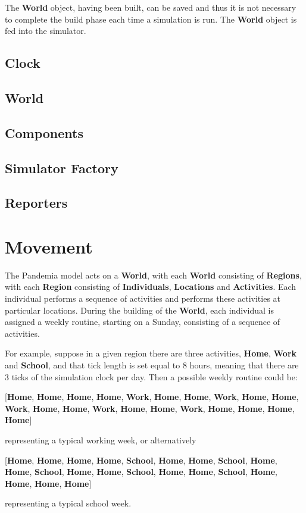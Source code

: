 \documentclass[10pt,letterpaper]{article}
\begin{document}
The \textbf{World} object, having been built, can be saved and thus it is not necessary to complete the build phase each time a simulation is run. The \textbf{World} object is fed into the simulator.

\subsection{Clock}

\subsection{World}

\subsection{Components}

\subsection{Simulator Factory}

\subsection{Reporters}

\section{Movement}

The Pandemia model acts on a \textbf{World}, with each \textbf{World} consisting of \textbf{Regions}, with each \textbf{Region} consisting of \textbf{Individuals}, \textbf{Locations} and \textbf{Activities}. Each individual performs a sequence of activities and performs these activities at particular locations. During the building of the \textbf{World}, each individual is assigned a weekly routine, starting on a Sunday, consisting of a sequence of activities.

For example, suppose in a given region there are three activities, \textbf{Home}, \textbf{Work} and \textbf{School}, and that tick length is set equal to 8 hours, meaning that there are 3 ticks of the simulation clock per day. Then a possible weekly routine could be:
\begin{center}
[\textbf{Home}, \textbf{Home}, \textbf{Home}, \textbf{Home}, \textbf{Work}, \textbf{Home}, \textbf{Home}, \textbf{Work}, \textbf{Home}, \textbf{Home}, \textbf{Work}, \textbf{Home}, \textbf{Home}, \textbf{Work}, \textbf{Home}, \textbf{Home}, \textbf{Work}, \textbf{Home}, \textbf{Home}, \textbf{Home}, \textbf{Home}]
\end{center}
representing a typical working week, or alternatively 
\begin{center}
[\textbf{Home}, \textbf{Home}, \textbf{Home}, \textbf{Home}, \textbf{School}, \textbf{Home}, \textbf{Home}, \textbf{School}, \textbf{Home}, \textbf{Home}, \textbf{School}, \textbf{Home}, \textbf{Home}, \textbf{School}, \textbf{Home}, \textbf{Home}, \textbf{School}, \textbf{Home}, \textbf{Home}, \textbf{Home}, \textbf{Home}]
\end{center}
representing a typical school week.
\end{document}
